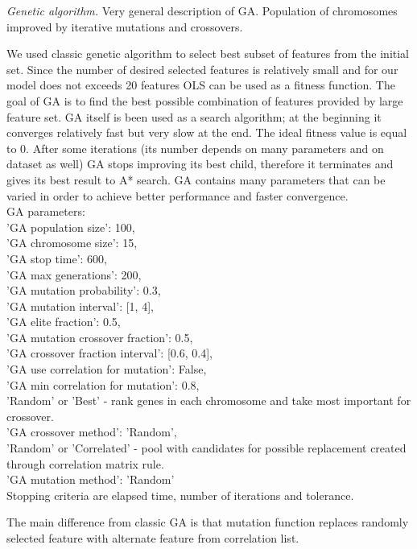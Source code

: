 \documentclass[aps,prl,reprint,amsmath,amssymb,nature]{revtex4-1}
\begin{document}
\textit{Genetic algorithm.}\textbf{ }Very general description of GA. 
Population of chromosomes improved by iterative mutations and crossovers.

We used classic genetic algorithm to select best subset of features from the initial set. Since the number of desired selected features is relatively small and for our model does not exceeds 20 features OLS can be used as a fitness function. The goal of GA is to find the best possible combination of features provided by large feature set. GA itself is been used as a search algorithm; at the beginning it converges relatively fast but very slow at the end. The ideal fitness value is equal to 0. After some iterations (its number depends on many parameters and on dataset as well) GA stops improving its best child, therefore it terminates and gives its best result to A* search. GA contains many parameters that can be varied in order to achieve better performance and faster convergence.\\ 
GA parameters:\\
'GA population size': 100,\\
'GA chromosome size': 15,\\
'GA stop time': 600,\\
'GA max generations': 200,\\
'GA mutation probability': 0.3,\\
'GA mutation interval': [1, 4],\\
'GA elite fraction': 0.5,\\
'GA mutation crossover fraction': 0.5,\\
'GA crossover fraction interval': [0.6, 0.4],\\
'GA use correlation for mutation': False,\\
'GA min correlation for mutation': 0.8,\\
'Random' or 'Best' - rank genes in each chromosome and take most important for crossover.\\
'GA crossover method': 'Random',\\
'Random' or 'Correlated' - pool with candidates for possible replacement created through correlation matrix rule.\\
'GA mutation method': 'Random'\\
            
Stopping criteria are elapsed time, number of iterations and tolerance. 

The main difference from classic GA is that mutation function replaces randomly selected feature with alternate feature from correlation list. 
\end{document}
